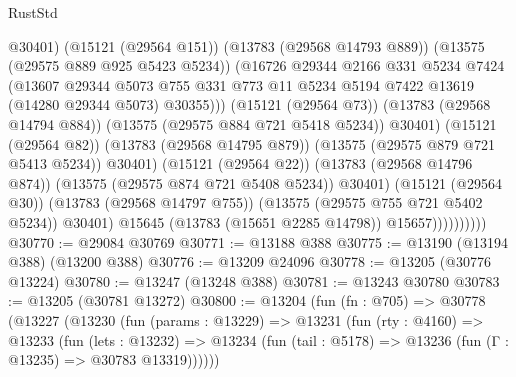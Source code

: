 \begin{lexlean}{RustStd}
\begin{coremodule}
                                    @30401)
                                  (@15121 (@29564 @151))
                                  (@13783 (@29568 @14793 @889))
                                  (@13575 (@29575 @889 @925 @5423 @5234))
                                  (@16726
                                    @29344
                                    @2166
                                    @331
                                    @5234
                                    @7424
                                    (@13607
                                      @29344
                                      @5073
                                      @755
                                      @331
                                      @773
                                      @11
                                      @5234
                                      @5194
                                      @7422
                                      @13619
                                      (@14280 @29344 @5073)
                                      @30355)))
                                (@15121 (@29564 @73))
                                (@13783 (@29568 @14794 @884))
                                (@13575 (@29575 @884 @721 @5418 @5234))
                                @30401)
                              (@15121 (@29564 @82))
                              (@13783 (@29568 @14795 @879))
                              (@13575 (@29575 @879 @721 @5413 @5234))
                              @30401)
                            (@15121 (@29564 @22))
                            (@13783 (@29568 @14796 @874))
                            (@13575 (@29575 @874 @721 @5408 @5234))
                            @30401)
                          (@15121 (@29564 @30))
                          (@13783 (@29568 @14797 @755))
                          (@13575 (@29575 @755 @721 @5402 @5234))
                          @30401)
                        @15645
                        (@13783 (@15651 @2285 @14798))
                        @15657))))))))))
@30770 := @29084 @30769
@30771 := @13188 @388
@30775 := @13190 (@13194 @388) (@13200 @388)
@30776 := @13209 @24096
@30778 := @13205 (@30776 @13224)
@30780 := @13247 (@13248 @388)
@30781 := @13243 @30780
@30783 := @13205 (@30781 @13272)
@30800 := @13204
    (fun (fn : @705) =>
    @30778
      (@13227
        (@13230
          (fun (params : @13229) =>
          @13231
            (fun (rty : @4160) =>
            @13233
              (fun (lets : @13232) =>
              @13234 (fun (tail : @5178) => @13236 (fun (Γ : @13235) => @30783 @13319))))))

\end{coremodule}
\end{lexlean}

